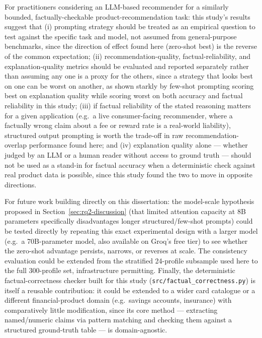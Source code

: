 For practitioners considering an LLM-based recommender for a similarly bounded, factually-checkable product-recommendation task: this study's results suggest that (i) prompting strategy should be treated as an empirical question to test against the specific task and model, not assumed from general-purpose benchmarks, since the direction of effect found here (zero-shot best) is the reverse of the common expectation; (ii) recommendation-quality, factual-reliability, and explanation-quality metrics should be evaluated and reported separately rather than assuming any one is a proxy for the others, since a strategy that looks best on one can be worst on another, as shown starkly by few-shot prompting scoring best on explanation quality while scoring worst on both accuracy and factual reliability in this study; (iii) if factual reliability of the stated reasoning matters for a given application (e.g.\ a live consumer-facing recommender, where a factually wrong claim about a fee or reward rate is a real-world liability), structured output prompting is worth the trade-off in raw recommendation-overlap performance found here; and (iv) explanation quality alone --- whether judged by an LLM or a human reader without access to ground truth --- should not be used as a stand-in for factual accuracy when a deterministic check against real product data is possible, since this study found the two to move in opposite directions.

For future work building directly on this dissertation: the model-scale hypothesis proposed in Section~\ref{sec:rq2-discussion} (that limited attention capacity at 8B parameters specifically disadvantages longer structured/few-shot prompts) could be tested directly by repeating this exact experimental design with a larger model (e.g.\ a 70B-parameter model, also available on Groq's free tier) to see whether the zero-shot advantage persists, narrows, or reverses at scale. The consistency evaluation could be extended from the stratified 24-profile subsample used here to the full 300-profile set, infrastructure permitting. Finally, the deterministic factual-correctness checker built for this study (\texttt{src/factual\_correctness.py}) is itself a reusable contribution: it could be extended to a wider card catalogue or a different financial-product domain (e.g.\ savings accounts, insurance) with comparatively little modification, since its core method --- extracting named/numeric claims via pattern matching and checking them against a structured ground-truth table --- is domain-agnostic.

